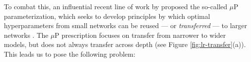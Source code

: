 \documentclass{article} %
\newcommand{\lorenzo}[1]{\fTBD{\textcolor{olive}{[Lorenzo] #1}}}
\newcommand{\cp}[1]{\fTBD{{\textcolor{blue}[CP: #1]}}}
\begin{document}
%
% 
%

%
To combat this, an influential recent line of work by \cite{yang2021tensor} proposed the so-called $\mu$P parameterization, which seeks to develop principles by which optimal hyperparameters from small networks can be reused — or \emph{transferred} — to larger networks \citep{yang2021tuning}. 
% 
The $\mu$P prescription focuses on transfer from narrower to wider models, but does not always transfer across depth (see Figure \ref{fig:lr-transfer}(a)).
%
% 
%
% 
This leads us to pose the following problem: 
%
\end{document}
